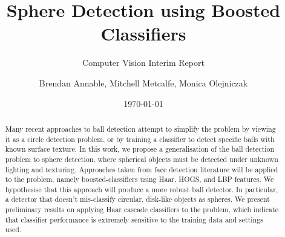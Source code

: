 \documentclass[11pt]{scrartcl}
\title{Sphere Detection using Boosted Classifiers}
\subtitle{Computer Vision Interim Report}
\author{Brendan Annable, Mitchell Metcalfe, Monica Olejniczak}
\date{\today}
\begin{document}
    \maketitle

    \begin{abstract}




        Many recent approaches to ball detection attempt to simplify the problem by viewing it as a circle detection problem, or by training a classifier to detect specific balls with known surface texture.
        In this work, we propose a generalisation of the ball detection problem to sphere detection, where spherical objects must be detected under unknown lighting and texturing.
        Approaches taken from face detection literature will be applied to the problem, namely boosted-classifiers using Haar, HOGS, and LBP features.
        We hypothesise that this approach will produce a more robust ball detector. In particular, a detector that doesn't mis-classify circular, disk-like objects as spheres.
        We present preliminary results on applying Haar cascade classifiers to the problem, which indicate that classifier performance is extremely sensitive to the training data and settings used.


    \end{abstract}
\end{document}
